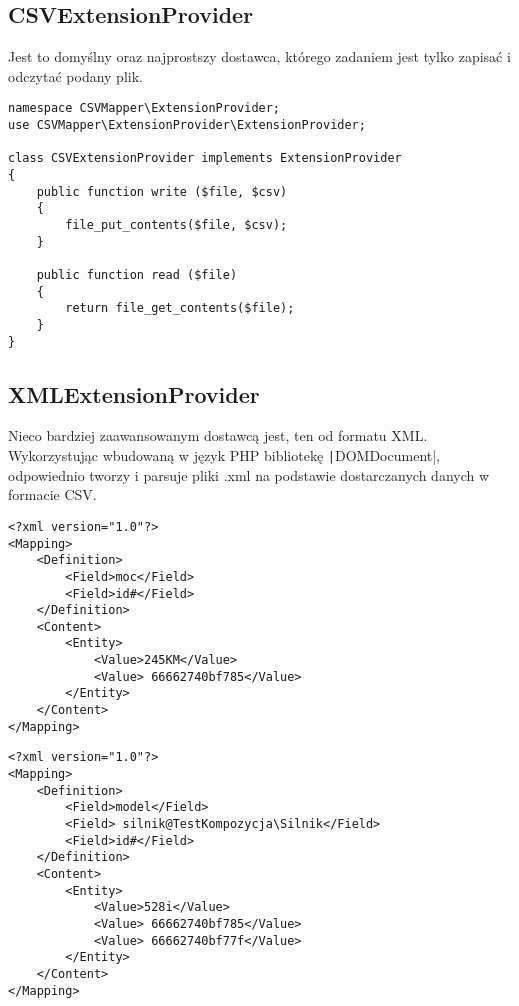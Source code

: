 \newpage
\subsection{CSVExtensionProvider}
Jest to domyślny oraz najprostszy dostawca, którego zadaniem jest tylko zapisać i odczytać podany plik. 

\begin{empty}
	\begin{verbatim}
namespace CSVMapper\ExtensionProvider;
use CSVMapper\ExtensionProvider\ExtensionProvider;

class CSVExtensionProvider implements ExtensionProvider
{
	public function write ($file, $csv)
	{
		file_put_contents($file, $csv);
	}
	
	public function read ($file)
	{
		return file_get_contents($file);
	}
}
	\end{verbatim}
	\vspace{-10pt}
\end{empty}

\subsection{XMLExtensionProvider}
Nieco bardziej zaawansowanym dostawcą jest, ten od formatu XML. Wykorzystując wbudowaną w język PHP bibliotekę \texttt|DOMDocument|, odpowiednio tworzy i parsuje pliki .xml na podstawie dostarczanych danych w formacie CSV.

\begin{empty}
	\begin{verbatim}
<?xml version="1.0"?>
<Mapping>
	<Definition>
		<Field>moc</Field>
		<Field>id#</Field>
	</Definition>
	<Content>
		<Entity>
			<Value>245KM</Value>
			<Value> 66662740bf785</Value>
		</Entity>
	</Content>
</Mapping>
	\end{verbatim}
	\vspace{-10pt}
\end{empty}

\begin{empty}
	\begin{verbatim}
<?xml version="1.0"?>
<Mapping>
	<Definition>
		<Field>model</Field>
		<Field> silnik@TestKompozycja\Silnik</Field>
		<Field>id#</Field>
	</Definition>
	<Content>
		<Entity>
			<Value>528i</Value>
			<Value> 66662740bf785</Value>
			<Value> 66662740bf77f</Value>
		</Entity>
	</Content>
</Mapping>
	\end{verbatim}
	\vspace{-10pt}
\end{empty}

